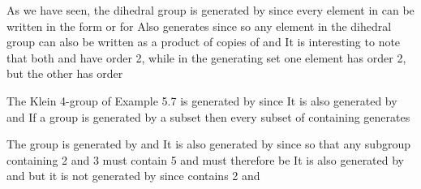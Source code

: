 \documentclass[11pt,oneside]{article}
\begin{document}
\begin{BookBody}
 As we have seen, the dihedral group is generated by \BookInline{\{\mu,\allowbreak \rho \}} since every element in  can be written in the form  or  for  Also\BookInline{,\allowbreak \{\mu,\allowbreak \mu \rho \}} generates  since \BookInline{\rho = \mu (\mu \rho ),\allowbreak } so any element in the dihedral group can also be written as a product of copies of \BookInline{\mu } and  It is interesting to note that both \BookInline{\mu } and \BookInline{\mu \rho } have order 2, while in the generating set \BookInline{\{\mu,\allowbreak \rho \}} one element has order 2, but the other has order \BookEnd{\blacktriangle}

 The Klein 4-group  of Example 5.7 is generated by  since  It is also generated by  and  If a group  is generated by a subset  then every subset of  containing  generates \BookEnd{\blacktriangle}

 The group  is generated by  and  It is also generated by  since  so that any subgroup containing 2 and 3 must contain 5 and must therefore be  It is also generated by  and  but it is not generated by  since  contains 2 and \BookEnd{\blacktriangle}

\end{BookBody}

\BookNarrativetrue
\end{document}
